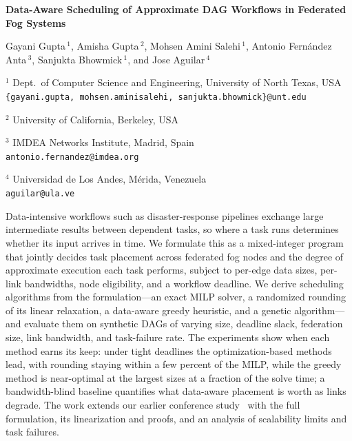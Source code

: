 \documentclass[11pt]{article}
\begin{document}
\begin{center}
    \Large{\textbf{Data-Aware Scheduling of Approximate DAG Workflows in Federated Fog Systems}}

    \vspace{0.5cm}

    \large{Gayani Gupta$\,^1$, Amisha Gupta$\,^2$, Mohsen Amini Salehi$\,^1$,
           Antonio Fern\'andez Anta$\,^3$, Sanjukta Bhowmick$\,^1$, and Jose Aguilar$\,^4$}

    \vspace{0.5cm}

    \normalsize

    $^1$ Dept.\ of Computer Science and Engineering, University of North Texas, USA\\
    \texttt{\{gayani.gupta, mohsen.aminisalehi, sanjukta.bhowmick\}@unt.edu}

    $^2$ University of California, Berkeley, USA

    $^3$ IMDEA Networks Institute, Madrid, Spain\\
    \texttt{antonio.fernandez@imdea.org}

    $^4$ Universidad de Los Andes, M\'erida, Venezuela\\
    \texttt{aguilar@ula.ve}

    \vspace{0.6cm}

\end{center}

Data-intensive workflows such as disaster-response pipelines exchange large
intermediate results between dependent tasks, so where a task runs determines
whether its input arrives in time. We formulate this as a mixed-integer
program that jointly decides task placement across federated fog nodes and
the degree of approximate execution each task performs, subject to per-edge
data sizes, per-link bandwidths, node eligibility, and a workflow deadline.
We derive scheduling algorithms from the formulation---an exact MILP solver,
a randomized rounding of its linear relaxation, a data-aware greedy heuristic,
and a genetic algorithm---and evaluate them on synthetic DAGs of varying size,
deadline slack, federation size, link bandwidth, and task-failure rate. The
experiments show when each method earns its keep: under tight deadlines the
optimization-based methods lead, with rounding staying within a few percent of
the MILP, while the greedy method is near-optimal at the largest sizes at a
fraction of the solve time; a bandwidth-blind baseline quantifies what
data-aware placement is worth as links degrade. The work extends our earlier
conference study~\cite{gupta2025efficient} with the full formulation, its
linearization and proofs, and an analysis of scalability limits and task
failures.



\end{document}
